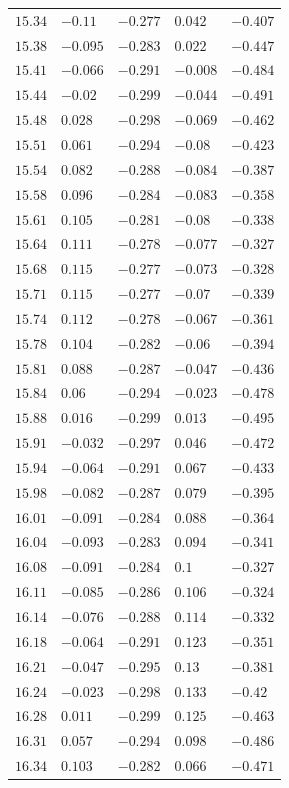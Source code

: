 \begin{table}[h]
\begin{tabular}{rllll}
$15.34$&$-0.11$&$-0.277$&$0.042$&$-0.407$\\
$15.38$&$-0.095$&$-0.283$&$0.022$&$-0.447$\\
$15.41$&$-0.066$&$-0.291$&$-0.008$&$-0.484$\\
$15.44$&$-0.02$&$-0.299$&$-0.044$&$-0.491$\\
$15.48$&$0.028$&$-0.298$&$-0.069$&$-0.462$\\
$15.51$&$0.061$&$-0.294$&$-0.08$&$-0.423$\\
$15.54$&$0.082$&$-0.288$&$-0.084$&$-0.387$\\
$15.58$&$0.096$&$-0.284$&$-0.083$&$-0.358$\\
$15.61$&$0.105$&$-0.281$&$-0.08$&$-0.338$\\
$15.64$&$0.111$&$-0.278$&$-0.077$&$-0.327$\\
$15.68$&$0.115$&$-0.277$&$-0.073$&$-0.328$\\
$15.71$&$0.115$&$-0.277$&$-0.07$&$-0.339$\\
$15.74$&$0.112$&$-0.278$&$-0.067$&$-0.361$\\
$15.78$&$0.104$&$-0.282$&$-0.06$&$-0.394$\\
$15.81$&$0.088$&$-0.287$&$-0.047$&$-0.436$\\
$15.84$&$0.06$&$-0.294$&$-0.023$&$-0.478$\\
$15.88$&$0.016$&$-0.299$&$0.013$&$-0.495$\\
$15.91$&$-0.032$&$-0.297$&$0.046$&$-0.472$\\
$15.94$&$-0.064$&$-0.291$&$0.067$&$-0.433$\\
$15.98$&$-0.082$&$-0.287$&$0.079$&$-0.395$\\
$16.01$&$-0.091$&$-0.284$&$0.088$&$-0.364$\\
$16.04$&$-0.093$&$-0.283$&$0.094$&$-0.341$\\
$16.08$&$-0.091$&$-0.284$&$0.1$&$-0.327$\\
$16.11$&$-0.085$&$-0.286$&$0.106$&$-0.324$\\
$16.14$&$-0.076$&$-0.288$&$0.114$&$-0.332$\\
$16.18$&$-0.064$&$-0.291$&$0.123$&$-0.351$\\
$16.21$&$-0.047$&$-0.295$&$0.13$&$-0.381$\\
$16.24$&$-0.023$&$-0.298$&$0.133$&$-0.42$\\
$16.28$&$0.011$&$-0.299$&$0.125$&$-0.463$\\
$16.31$&$0.057$&$-0.294$&$0.098$&$-0.486$\\
$16.34$&$0.103$&$-0.282$&$0.066$&$-0.471$\\

\end{tabular}
\end{table}
